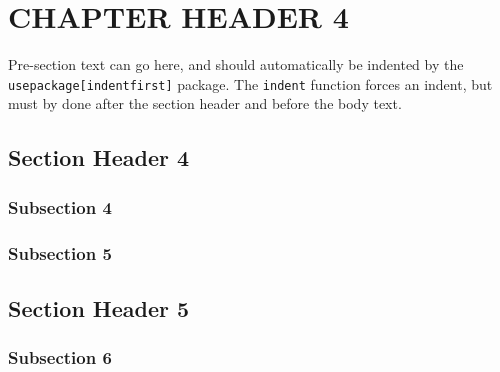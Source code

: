 \chapter{CHAPTER HEADER 4}\label{ch:change_this_4}







\setlength{\parindent}{10mm} %
\indent Pre-section text can go here, and should automatically be indented by the \texttt{usepackage[indentfirst]} package. The \texttt{indent} function forces an indent, but must by done after the section header and before the body text.




\flushleft
\section*{Section Header 4}

\setlength{\parindent}{10mm}
\indent \lipsum[18-20]




\flushleft
\subsection*{Subsection 4}

\setlength{\parindent}{10mm}
\lipsum[21]




\flushleft
\subsection*{Subsection 5}

\setlength{\parindent}{10mm}
\lipsum[22]




\flushleft
\section*{Section Header 5}

\setlength{\parindent}{10mm}
\indent \lipsum[23-24]




\flushleft
\subsection*{Subsection 6}

\setlength{\parindent}{10mm}
\lipsum[25]




\pagebreak